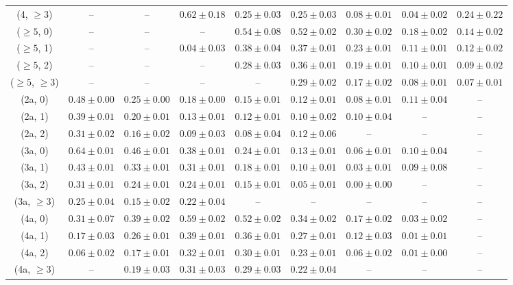 \begin{table}[h!]
{\begin{tabular}{ccccccccc}
	(4, $\ge3$) & -- & -- & $0.62\pm 0.18$ & $0.25\pm 0.03$ & $0.25\pm 0.03$ & $0.08\pm 0.01$ & $0.04\pm 0.02$ & $0.24\pm 0.22$ \\[0.5ex] 
	($\ge5$, 0) & -- & -- & -- & $0.54\pm 0.08$ & $0.52\pm 0.02$ & $0.30\pm 0.02$ & $0.18\pm 0.02$ & $0.14\pm 0.02$ \\[0.5ex] 
	($\ge5$, 1) & -- & -- & $0.04\pm 0.03$ & $0.38\pm 0.04$ & $0.37\pm 0.01$ & $0.23\pm 0.01$ & $0.11\pm 0.01$ & $0.12\pm 0.02$ \\[0.5ex] 
	($\ge5$, 2) & -- & -- & -- & $0.28\pm 0.03$ & $0.36\pm 0.01$ & $0.19\pm 0.01$ & $0.10\pm 0.01$ & $0.09\pm 0.02$ \\[0.5ex] 
	($\ge5$, $\ge3$) & -- & -- & -- & -- & $0.29\pm 0.02$ & $0.17\pm 0.02$ & $0.08\pm 0.01$ & $0.07\pm 0.01$ \\[0.5ex] 
	(2a, 0) & $0.48\pm 0.00$ & $0.25\pm 0.00$ & $0.18\pm 0.00$ & $0.15\pm 0.01$ & $0.12\pm 0.01$ & $0.08\pm 0.01$ & $0.11\pm 0.04$ & -- \\[0.5ex] 
	(2a, 1) & $0.39\pm 0.01$ & $0.20\pm 0.01$ & $0.13\pm 0.01$ & $0.12\pm 0.01$ & $0.10\pm 0.02$ & $0.10\pm 0.04$ & -- & -- \\[0.5ex] 
	(2a, 2) & $0.31\pm 0.02$ & $0.16\pm 0.02$ & $0.09\pm 0.03$ & $0.08\pm 0.04$ & $0.12\pm 0.06$ & -- & -- & -- \\[0.5ex] 
	(3a, 0) & $0.64\pm 0.01$ & $0.46\pm 0.01$ & $0.38\pm 0.01$ & $0.24\pm 0.01$ & $0.13\pm 0.01$ & $0.06\pm 0.01$ & $0.10\pm 0.04$ & -- \\[0.5ex] 
	(3a, 1) & $0.43\pm 0.01$ & $0.33\pm 0.01$ & $0.31\pm 0.01$ & $0.18\pm 0.01$ & $0.10\pm 0.01$ & $0.03\pm 0.01$ & $0.09\pm 0.08$ & -- \\[0.5ex] 
	(3a, 2) & $0.31\pm 0.01$ & $0.24\pm 0.01$ & $0.24\pm 0.01$ & $0.15\pm 0.01$ & $0.05\pm 0.01$ & $0.00\pm 0.00$ & -- & -- \\[0.5ex] 
	(3a, $\ge3$) & $0.25\pm 0.04$ & $0.15\pm 0.02$ & $0.22\pm 0.04$ & -- & -- & -- & -- & -- \\[0.5ex] 
	(4a, 0) & $0.31\pm 0.07$ & $0.39\pm 0.02$ & $0.59\pm 0.02$ & $0.52\pm 0.02$ & $0.34\pm 0.02$ & $0.17\pm 0.02$ & $0.03\pm 0.02$ & -- \\[0.5ex] 
	(4a, 1) & $0.17\pm 0.03$ & $0.26\pm 0.01$ & $0.39\pm 0.01$ & $0.36\pm 0.01$ & $0.27\pm 0.01$ & $0.12\pm 0.03$ & $0.01\pm 0.01$ & -- \\[0.5ex] 
	(4a, 2) & $0.06\pm 0.02$ & $0.17\pm 0.01$ & $0.32\pm 0.01$ & $0.30\pm 0.01$ & $0.23\pm 0.01$ & $0.06\pm 0.02$ & $0.01\pm 0.00$ & -- \\[0.5ex] 
	(4a, $\ge3$) & -- & $0.19\pm 0.03$ & $0.31\pm 0.03$ & $0.29\pm 0.03$ & $0.22\pm 0.04$ & -- & -- & -- \\[0.5ex] 

\end{tabular}}
\end{table}
